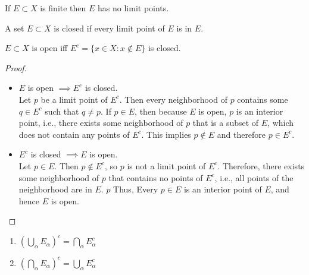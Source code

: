 \begin{corollary}
	If $E \subset X$ is finite then $E$ has no limit points.
\end{corollary}

\begin{definition}
	A set $E \subset X$ is closed if every limit point of $E$ is in $E$.
\end{definition}
\begin{theorem}
	$E \subset X$ is open iff $E^{c}=\{x \in X: x \not\in E\}$ is closed.
	\begin{proof}
		\label{prf:open_closed}
		\hfill
		\begin{itemize}
			\item $E$ is open $\implies E^{c}$ is closed.\\
			      Let $p$ be a limit point of $E^{c}$. Then every neighborhood of $p$ contains some $q \in E^{c}$ such that $q \neq p$. If $p \in E$, then because $E$ is open, $p$ is an interior point, i.e., there exists some neighborhood of $p$ that is a subset of $E$, which does not contain any points of $E^{c}$.
			      This implies $p \not\in E$ and therefore $p \in E^{c}$.
			\item $E^{c}$ is closed $\implies E$ is open.\\
			      Let $p \in E$. Then $p \not\in E^{c}$, so $p$ is not a limit point of $E^{c}$.
			      Therefore, there exists some neighborhood of $p$ that contains no points of $E^{c}$, i.e., all points of the neighborhood are in $E$. $p$
			      Thus, Every $p \in E$ is an interior point of $E$, and hence $E$ is open.
		\end{itemize}
	\end{proof}
\end{theorem}

\begin{theorem}
	\hfill
	\begin{enumerate}[label=(\alph*)]
		\item $(\bigcup _{\alpha} E_{\alpha})^{c}=\bigcap_{\alpha} E_{\alpha}^{c}$
		\item $(\bigcap_{\alpha} E_{\alpha})^{c}=\bigcup_{\alpha} E_{\alpha}^{c}$
	\end{enumerate}
\end{theorem}

